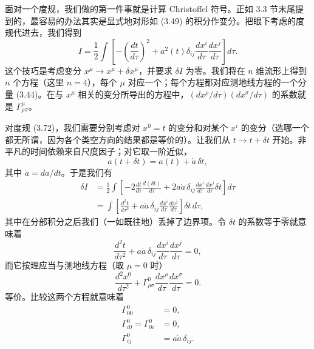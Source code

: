 面对一个度规，我们做的第一件事就是计算 Christoffel 符号。正如 3.3 节末尾提到的，最容易的办法其实是显式地对形如 (3.49) 的积分作变分。把眼下考虑的度规代进去，我们得到
\begin{equation*}
I = \frac{1}{2}\int\left[-\left(\frac{dt}{d\tau}\right)^2 + a^2(t)\delta_{ij}\frac{dx^i}{d\tau}\frac{dx^j}{d\tau}\right]d\tau.
\tag{3.73}
\end{equation*}
这个技巧是考虑变分 $x^\mu \rightarrow x^\mu + \delta x^\mu$，并要求 $\delta I$ 为零。我们将在 $n$ 维流形上得到 $n$ 个方程（这里 $n = 4$），每个 $\mu$ 对应一个；每个方程都对应测地线方程的一个分量 (3.44)。在与 $x^\mu$ 相关的变分所导出的方程中，$(dx^\rho/d\tau)(dx^\sigma/d\tau)$ 的系数就是 $\Gamma^\mu_{\rho\sigma}$。

对度规 (3.72)，我们需要分别考虑对 $x^0 = t$ 的变分和对某个 $x^i$ 的变分（选哪一个都无所谓，因为各个类空方向的结果都是等价的）。让我们从 $t \rightarrow t + \delta t$ 开始。非平凡的时间依赖来自尺度因子；对它取一阶近似，
\begin{equation*}
a(t + \delta t) = a(t) + \dot{a}\,\delta t,
\tag{3.74}
\end{equation*}
其中 $\dot{a} = da/dt$。于是我们有
\begin{align*}
\delta I &= \frac{1}{2}\int\left[-2\frac{dt}{d\tau}\frac{d(\delta t)}{d\tau} + 2a\dot{a}\,\delta_{ij}\frac{dx^i}{d\tau}\frac{dx^j}{d\tau}\delta t\right]d\tau\\
&= \int\left[\frac{d^2t}{d\tau^2} + a\dot{a}\,\delta_{ij}\frac{dx^i}{d\tau}\frac{dx^j}{d\tau}\right]\delta t\,d\tau,
\tag{3.75}
\end{align*}
其中在分部积分之后我们（一如既往地）丢掉了边界项。令 $\delta t$ 的系数等于零就意味着
\begin{equation*}
\frac{d^2t}{d\tau^2} + a\dot{a}\,\delta_{ij}\frac{dx^i}{d\tau}\frac{dx^j}{d\tau} = 0,
\tag{3.76}
\end{equation*}
而它按理应当与测地线方程（取 $\mu = 0$ 时）
\begin{equation*}
\frac{d^2x^0}{d\tau^2} + \Gamma^0_{\rho\sigma}\frac{dx^\rho}{d\tau}\frac{dx^\sigma}{d\tau} = 0.
\tag{3.77}
\end{equation*}
等价。比较这两个方程就意味着
\begin{align*}
\Gamma^0_{00} &= 0,\\
\Gamma^0_{i0} = \Gamma^0_{0i} &= 0,\\
\Gamma^0_{ij} &= a\dot{a}\,\delta_{ij}.
\tag{3.78}
\end{align*}

